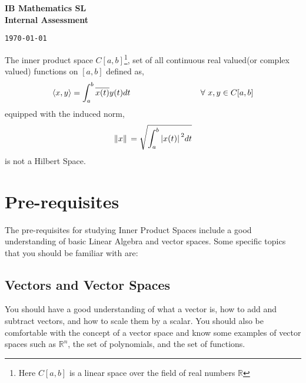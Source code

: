 \documentclass[12pt, a4paper]{article} %
\begin{document}
\begin{titlepage}
    \begin{center}
        \vspace*{1cm}
        \Large{\textbf{IB Mathematics SL}}\\ 
        \Large{\bf Internal Assessment}
        \vfill %

        {\tt \today}\\
    \end{center}
\end{titlepage}

\tableofcontents
\thispagestyle{empty}
\clearpage

\setcounter{page}{1}


       
    \begin{tcolorbox}[colback=gray!5!white, colframe=blue!50!black,title=\begin{center}
        \section{ Title of the Project(Problem)}
    \end{center}]
        The inner product space $C[a,b]$\footnote{Here $C[a,b]$ is a linear space over the field of real numbers $\mathbb{R}$}, set of all continuous real valued(or complex valued) functions on $[a,b]$ defined as,
        \[\langle x,y \rangle = \int_{a}^{b} \overline{x(t)}y(t) dt \hspace*{3cm} \forall\  x,y \in C[a,b]\] equipped with the induced norm, 
        \[\norm*{x} = \sqrt{\int_{a}^{b}\abs*{x(t)}^2 dt}\]
        is not a Hilbert Space.
    \end{tcolorbox}

    \section{Pre-requisites}  

    The pre-requisites for studying Inner Product Spaces include a good understanding of basic Linear Algebra and vector spaces. Some specific topics that you should be familiar with are:
          \subsection{Vectors and Vector Spaces}
          You should have a good understanding of what a vector is, how to add and subtract vectors, and how to scale them by a scalar. You should also be comfortable with the concept of a vector space and know some examples of vector spaces such as $\mathbb{R}^n$, the set of polynomials, and the set of functions.
\end{document}
